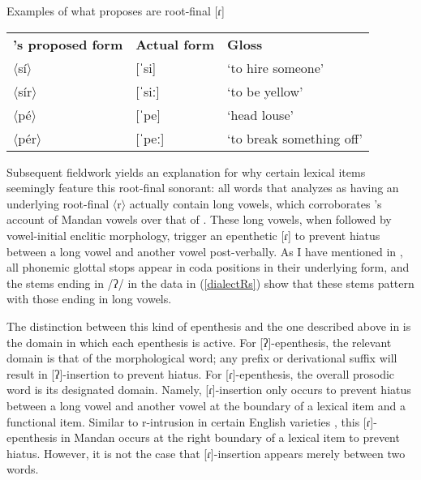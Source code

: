 \begin{exe}
\item\label{hollowRs} Examples of what \citet{hollow1970} proposes are root-final [ɾ]

\begin{tabular}{lll}
\textbf{\citeauthor{hollow1970}'s proposed form}&
	\textbf{Actual form}&
	\textbf{Gloss}\\
$\langle$sí$\rangle$&
	[ˈsi]&
	`to hire someone'\\
$\langle$sír$\rangle$&
	[ˈsiː]&
	`to be yellow'\\
$\langle$pé$\rangle$&
	[ˈpe]&
	`head louse'\\
$\langle$pér$\rangle$&
	[ˈpeː]&
	`to break something off'\\
\end{tabular}

\end{exe}

Subsequent fieldwork yields an explanation for why certain lexical items seemingly feature this root-final sonorant: all words that \citeauthor{hollow1970} analyzes as having an underlying root-final $\langle$r$\rangle$ actually contain long vowels, which corroborates \citeauthor{carter1991a}'s account of Mandan vowels over that of \citeauthor{hollow1970}. These long vowels, when followed by vowel-initial enclitic morphology, trigger an epenthetic [ɾ] to prevent hiatus between a long vowel and another vowel post-verbally. As I have mentioned in , all phonemic glottal stops appear in coda positions in their underlying form, and the stems ending in  /ʔ/ in the data in (\ref{dialectRs}) show that these stems pattern with those ending in long vowels.

The distinction between this kind of epenthesis and the one described above in  is the domain in which each epenthesis is active. For [ʔ]-epenthesis, the relevant domain is that of the morphological word; any prefix or derivational suffix will result in [ʔ]-insertion to prevent hiatus. For [ɾ]-epenthesis, the overall prosodic word is its designated domain. Namely, [ɾ]-insertion only occurs to prevent hiatus between a long vowel and another vowel at the boundary of a lexical item and a functional item. Similar to r-intrusion in certain English varieties \citep{gick1999}, this [ɾ]-epenthesis in Mandan occurs at the right boundary of a lexical item to prevent hiatus. However, it is not the case that [ɾ]-insertion appears merely between two words.

